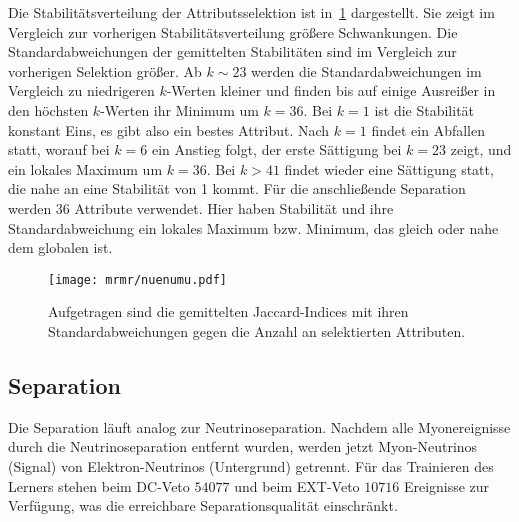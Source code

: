 Die Stabilitätsverteilung der Attributsselektion ist in~\ref{fig:mrmrnuevsnumu} dargestellt.
Sie zeigt im Vergleich zur vorherigen Stabilitätsverteilung größere Schwankungen.
Die Standardabweichungen der gemittelten Stabilitäten sind im Vergleich zur vorherigen Selektion größer.
Ab $k\sim 23$ werden die Standardabweichungen im Vergleich zu niedrigeren $k$-Werten kleiner und finden bis auf einige Ausreißer in den höchsten $k$-Werten ihr Minimum um $k=36$.
Bei $k = 1$ ist die Stabilität konstant Eins, es gibt also ein bestes Attribut.
Nach $k=1$ findet ein Abfallen statt, worauf bei $k=6$ ein Anstieg folgt, der erste Sättigung bei $k=23$ zeigt, und ein lokales Maximum um $k=36$.
Bei $k>41$ findet wieder eine Sättigung statt, die nahe an eine Stabilität von 1 kommt. 
Für die anschließende Separation werden 36 Attribute verwendet.
Hier haben Stabilität und ihre Standardabweichung ein lokales Maximum bzw. Minimum, das gleich oder nahe dem globalen ist.

\begin{figure}
\begin{center}
    \texttt{[image: mrmr/nuenumu.pdf]}
\end{center}
\vspace{-2em}
\caption{Aufgetragen sind die gemittelten Jaccard-Indices mit ihren Standardabweichungen gegen die Anzahl an selektierten Attributen.}
\label{fig:mrmrnuevsnumu}
\end{figure}




\subsection{Separation}
\label{myonseparation}
Die Separation läuft analog zur Neutrinoseparation.
Nachdem alle Myonereignisse durch die Neutrinoseparation entfernt wurden, werden jetzt Myon-Neutrinos (Signal) von Elektron-Neutrinos (Untergrund) getrennt.
Für das Trainieren des Lerners stehen beim DC-Veto $\num{54077}$ und beim EXT-Veto $\num{10716}$ Ereignisse zur Verfügung, was die erreichbare Separationsqualität einschränkt.

